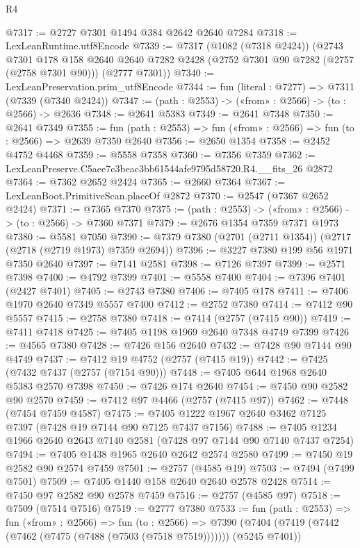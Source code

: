 \begin{lexlean}{R4}
\begin{coremodule}
@7317 := @2727 @7301 @1494 @384 @2642 @2640 @7284
@7318 := LexLeanRuntime.utf8Encode
@7339 := @7317
    (@1082 (@7318 @2424))
    (@2743
      @7301
      @178
      @158
      @2640
      @2640
      @7282
      @2428
      (@2752 @7301 @90 @7282 (@2757 (@2758 @7301 @90)))
      (@2777 @7301))
@7340 := LexLeanPreservation.prim_utf8Encode
@7344 := fun (literal : @7277) => @7311 (@7339 (@7340 @2424))
@7347 := (path : @2553) -> («from» : @2566) -> (to : @2566) -> @2636
@7348 := @2641 @5383
@7349 := @2641 @7348
@7350 := @2641 @7349
@7355 := fun (path : @2553) => fun («from» : @2566) => fun (to : @2566) => @2639 @7350 @2640
@7356 := @2650 @1354
@7358 := @2452 @4752 @4468
@7359 := @5558 @7358
@7360 := @7356 @7359
@7362 := LexLeanPreserve.C5aee7c3beac3bb61544afe9795d58720.R4.__fits_26 @2872
@7364 := @7362 @2652 @2424
@7365 := @2660 @7364
@7367 := LexLeanBoot.PrimitiveScan.placeOf @2872
@7370 := @2547 (@7367 @2652 @2424)
@7371 := @7365 @7370
@7375 := (path : @2553) -> («from» : @2566) -> (to : @2566) -> @7360 @7371
@7379 := @2676 @1354 @7359 @7371 @1973
@7380 := @5581 @7050
@7390 := @7379 @7380 (@2701 (@2711 @1354)) (@2717 (@2718 (@2719 @1973) @7359 @2694))
@7396 := @3227 @7380 @199 @56 @1971 @7350 @2640
@7397 := @7141 @2581
@7398 := @7126 @7397
@7399 := @2571 @7398
@7400 := @4792 @7399
@7401 := @5558 @7400
@7404 := @7396 @7401 (@2427 @7401)
@7405 := @2743 @7380
@7406 := @7405 @178
@7411 := @7406 @1970 @2640 @7349 @5557 @7400
@7412 := @2752 @7380
@7414 := @7412 @90 @5557
@7415 := @2758 @7380
@7418 := @7414 (@2757 (@7415 @90))
@7419 := @7411 @7418
@7425 := @7405 @1198 @1969 @2640 @7348 @4749 @7399
@7426 := @4565 @7380
@7428 := @7426 @156 @2640
@7432 := @7428 @90 @7144 @90 @4749
@7437 := @7412 @19 @4752 (@2757 (@7415 @19))
@7442 := @7425 (@7432 @7437 (@2757 (@7154 @90)))
@7448 := @7405 @644 @1968 @2640 @5383 @2570 @7398
@7450 := @7426 @174 @2640
@7454 := @7450 @90 @2582 @90 @2570
@7459 := @7412 @97 @4466 (@2757 (@7415 @97))
@7462 := @7448 (@7454 @7459 @4587)
@7475 := @7405 @1222 @1967 @2640 @3462 @7125 @7397 (@7428 @19 @7144 @90 @7125 @7437 @7156)
@7488 := @7405 @1234 @1966 @2640 @2643 @7140 @2581 (@7428 @97 @7144 @90 @7140 @7437 @7254)
@7494 := @7405 @1438 @1965 @2640 @2642 @2574 @2580
@7499 := @7450 @19 @2582 @90 @2574 @7459
@7501 := @2757 (@4585 @19)
@7503 := @7494 (@7499 @7501)
@7509 := @7405 @1440 @158 @2640 @2640 @2578 @2428
@7514 := @7450 @97 @2582 @90 @2578 @7459
@7516 := @2757 (@4585 @97)
@7518 := @7509 (@7514 @7516)
@7519 := @2777 @7380
@7533 := fun (path : @2553) =>
  fun («from» : @2566) =>
  fun (to : @2566) =>
  @7390 (@7404 (@7419 (@7442 (@7462 (@7475 (@7488 (@7503 (@7518 @7519))))))) (@5245 @7401))

\end{coremodule}
\end{lexlean}
